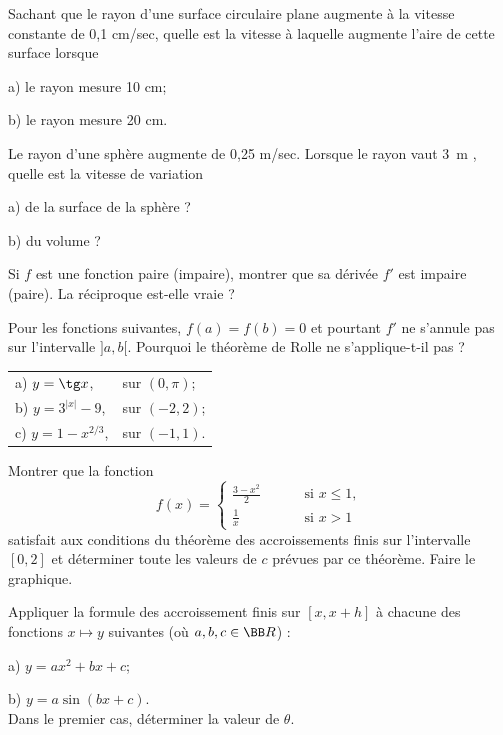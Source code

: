 \documentclass[12pt,french,oneside,a4paper]{memoir} %
\begin{document}
\begin{exo}
Sachant que le rayon d'une surface circulaire plane augmente
 à la vitesse constante de 0,1 cm/sec, quelle est la vitesse à
 laquelle augmente l'aire de cette surface lorsque
 
 a) le rayon mesure 10 cm;
 
 b) le rayon mesure 20 cm.
\end{exo}
\begin{exo}
Le rayon d'une sphère augmente de 0,25 m/sec. Lorsque le
 rayon vaut 3~m , quelle est la vitesse de variation 
 
 a) de la surface de la sphère ?
 
 b) du volume ?
\end{exo}
\begin{exo}
Si $f$ est une fonction paire (impaire), montrer que sa
 dérivée $f'$ est impaire (paire). La réciproque est-elle
 vraie ?
\end{exo}
\begin{exo}
Pour les fonctions suivantes, $f(a)=f(b)=0$ et pourtant $f'$
 ne s'annule pas sur l'intervalle $]a,b[$. Pourquoi le théorème
 de Rolle ne s'applique-t-il
 pas ?
 
 \begin{tabular}{ll}
 a) $y=\tg x$,&sur $(0,\pi)$;\\[2mm]
 b) $y=3^{|x|}-9$,&sur $(-2,2)$;\\[2mm]
 c) $y=1-x^{2/3}$,\qquad&sur $(-1,1)$.
 \end{tabular}
\end{exo}
\begin{exo}
Montrer que la fonction
 \begin{equation*}
 f(x)=\left\{
 \begin{array}{ll}
 \displaystyle{\frac{3-x^2}{2}}\qquad&\mbox{ si } x\leq 1,\\[2mm]
 \displaystyle{\frac{1}{x}}&\mbox{ si } x> 1
 \end{array}
 \right.
\end{equation*}
 satisfait aux conditions du théorème des accroissements finis
 sur l'intervalle $[0,2]$ et déterminer toute les valeurs de $c$
 prévues par ce théorème. Faire le graphique.
\end{exo}
\begin{exo}
Appliquer la formule des accroissement finis sur $[x, x+h]$
 à chacune des fonctions $x\mapsto y$ suivantes (où $a, b,
 c\in\BB R$) :
 
 a) $y=ax^2+bx+c$;
 
 b) $y=a\sin(bx+c)$.\\
 Dans le premier cas, déterminer la valeur de $\theta$.
\end{exo}
\end{document}
